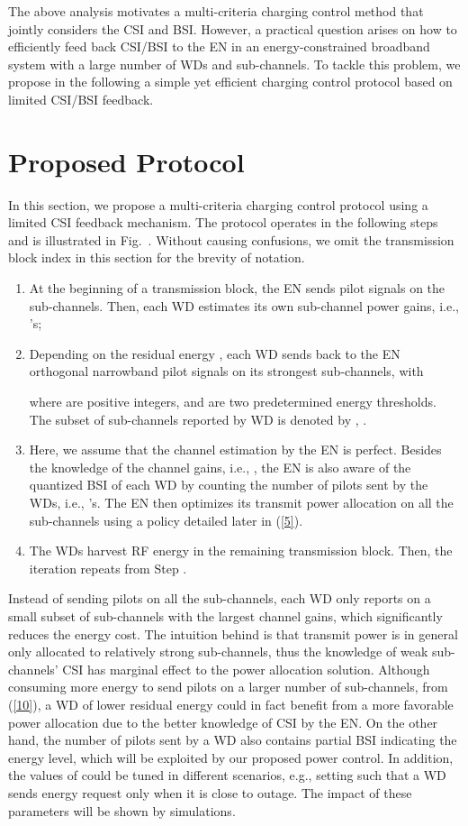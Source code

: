 \documentclass[conference]{IEEEtran}
\begin{document}
The above analysis motivates a multi-criteria charging control method that jointly considers the CSI and BSI. However, a practical question arises on how to efficiently feed back CSI/BSI to the EN in an energy-constrained broadband system with a large number of WDs and sub-channels. To tackle this problem, we propose in the following a simple yet efficient charging control protocol based on limited CSI/BSI feedback.

\section{Proposed Protocol}

In this section, we propose a multi-criteria charging control protocol using a limited CSI feedback mechanism. The protocol operates in the following steps and is illustrated in Fig.~. Without causing confusions, we omit the transmission block index  in this section for the brevity of notation.
\begin{enumerate}
  \item At the beginning of a transmission block, the EN sends pilot signals on the  sub-channels. Then, each WD  estimates its own sub-channel power gains, i.e., 's;
  \item Depending on the residual energy , each WD  sends back to the EN orthogonal narrowband pilot signals on its  strongest sub-channels, with
      
where  are positive integers, and  are two predetermined energy thresholds. The subset of sub-channels reported by WD  is denoted by , .
\item Here, we assume that the channel estimation by the EN is perfect. Besides the knowledge of the channel gains, i.e., , the EN is also aware of the quantized BSI of each WD by counting the number of pilots sent by the WDs, i.e., 's. The EN then optimizes its transmit power allocation on all the sub-channels using a policy detailed later in (\ref{5}).
\item The WDs harvest RF energy in the remaining transmission block. Then, the iteration repeats from Step .
\end{enumerate}
Instead of sending pilots on all the sub-channels, each WD only reports on a small subset of sub-channels with the largest channel gains, which significantly reduces the energy cost. The intuition behind is that transmit power is in general only allocated to relatively strong sub-channels, thus the knowledge of weak sub-channels' CSI has marginal effect to the power allocation solution. Although consuming more energy to send pilots on a larger number of sub-channels, from (\ref{10}), a WD of lower residual energy could in fact benefit from a more favorable power allocation due to the better knowledge of CSI by the EN. On the other hand, the number of pilots sent by a WD also contains partial BSI indicating the energy level, which will be exploited by our proposed power control. In addition, the values of  could be tuned in different scenarios, e.g., setting  such that a WD sends energy request only when it is close to outage. The impact of these parameters will be shown by simulations.
\end{document}
